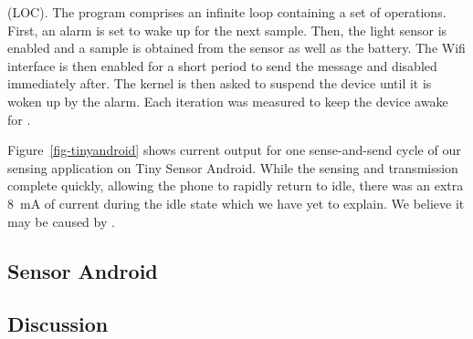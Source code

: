 (LOC). The program comprises an infinite loop containing a set of operations. 
First, an alarm is set to wake up for the next sample. Then, the light
sensor is enabled and a sample is obtained from the sensor as well as the
battery. The Wifi interface is then enabled for a short period to send the
message and disabled immediately after. The kernel is then asked to suspend the
device until it is woken up by the alarm.
Each iteration was measured to keep the device awake for .

Figure~\ref{fig-tinyandroid} shows current output for one sense-and-send
cycle of our sensing application on Tiny Sensor Android. While the sensing
and transmission complete quickly, allowing the phone to rapidly return to
idle, there was an extra 8~mA of current during the idle state which we have
yet to explain. We believe it may be caused by .

\subsection{Sensor Android}
\label{subsec-full}


\subsection{Discussion}

